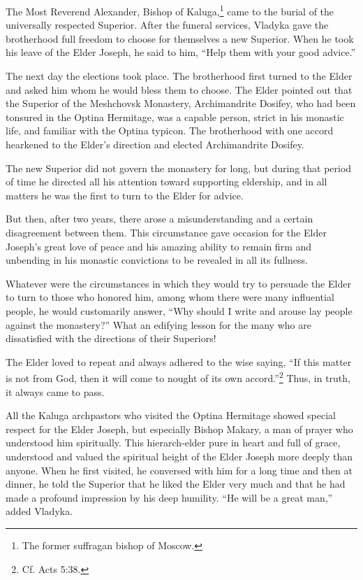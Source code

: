 The Most Reverend Alexander, Bishop of Kaluga,\footnote{The former suffragan bishop of Moscow.} came to the burial of the universally respected Superior. After the funeral services, Vladyka gave the brotherhood full freedom to choose for themselves a new Superior. When he took his leave of the Elder Joseph, he said to him, ``Help them with your good advice.''

The next day the elections took place. The brotherhood first turned to the Elder and asked him whom he would bless them to choose. The Elder pointed out that the Superior of the Meshchovsk Monastery, Archimandrite Dosifey, who had been tonsured in the Optina Hermitage, was a capable person, strict in his monastic life, and familiar with the Optina typicon. The brotherhood with one accord hearkened to the Elder's direction and elected Archimandrite Dosifey.

The new Superior did not govern the monastery for long, but during that period of time he directed all his attention toward supporting eldership, and in all matters he was the first to turn to the Elder for advice.

But then, after two years, there arose a misunderstanding and a certain disagreement between them. This circumstance gave occasion for the Elder Joseph's great love of peace and his amazing ability to remain firm and unbending in his monastic convictions to be revealed in all its fullness.

Whatever were the circumstances in which they would try to persuade the Elder to turn to those who honored him, among whom there were many influential people, he would customarily answer, ``Why should I write and arouse lay people against the monastery?'' What an edifying lesson for the many who are dissatisfied with the directions of their Superiors!

The Elder loved to repeat and always adhered to the wise saying, ``If this matter is not from God, then it will come to nought of its own accord.''\footnote{Cf. Acts 5:38.} Thus, in truth, it always came to pass.

All the Kaluga archpastors who visited the Optina Hermitage showed special respect for the Elder Joseph, but especially Bishop Makary, a man of prayer who understood him spiritually. This hierarch-elder pure in heart and full of grace, understood and valued the spiritual height of the Elder Joseph more deeply than anyone. When he first visited, he conversed with him for a long time and then at dinner, he told the Superior that he liked the Elder very much and that he had made a profound impression by his deep humility. ``He will be a great man,'' added Vladyka.

